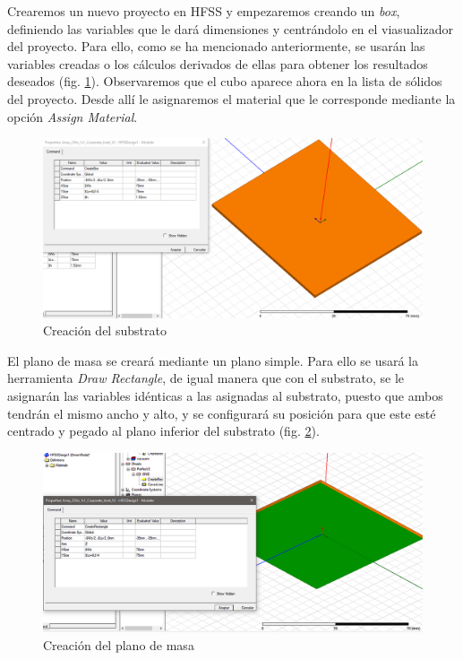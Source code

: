 \par Crearemos un nuevo proyecto en HFSS y empezaremos creando un \textit{box}, definiendo las variables que le dará dimensiones y centrándolo en el viasualizador del proyecto. Para ello, como se ha mencionado anteriormente, se usarán las variables creadas o los cálculos derivados de ellas para obtener los resultados deseados (fig. \ref{fig:substrato}). Observaremos que el cubo aparece ahora en la lista de sólidos del proyecto. Desde allí le asignaremos el material que le corresponde mediante la opción \textit{Assign Material}. 
\\
\begin{figure}[p]
    \centering
        \includegraphics[width=\textwidth]{archivos/desarrollo/1}
        \caption{Creación del substrato}
        \label{fig:substrato}
\end{figure}
\par El plano de masa se creará mediante un plano simple. Para ello se usará la herramienta \textit{Draw Rectangle}, de igual manera que con el substrato, se le asignarán las variables idénticas a las asignadas al substrato, puesto que ambos tendrán el mismo ancho y alto, y se configurará su posición para que este esté centrado y pegado al plano inferior del substrato (fig. \ref{fig:masa}).
\\
\begin{figure}[p]
    \centering
        \includegraphics[width=\textwidth]{archivos/desarrollo/2}
        \caption{Creación del plano de masa}
        \label{fig:masa}
\end{figure}
